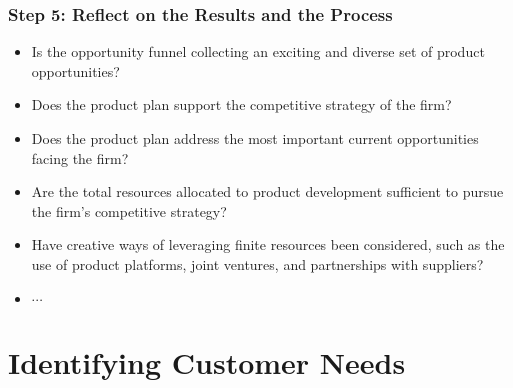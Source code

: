 \documentclass[a4paper,12pt,openany]{book}
\begin{document}
\subsection{Step 5: Reflect on the Results and the Process}
\begin{itemize}
    \item Is the opportunity funnel collecting an exciting and diverse set of product opportunities?
    \item Does the product plan support the competitive strategy of the firm?
    \item Does the product plan address the most important current opportunities facing the firm?
    \item Are the total resources allocated to product development sufficient to pursue the firm's competitive strategy?
    \item Have creative ways of leveraging finite resources been considered, such as the use of product platforms, joint ventures, and partnerships with suppliers?
    \item $\cdots$
\end{itemize}

\chapter{Identifying Customer Needs}
\end{document}
